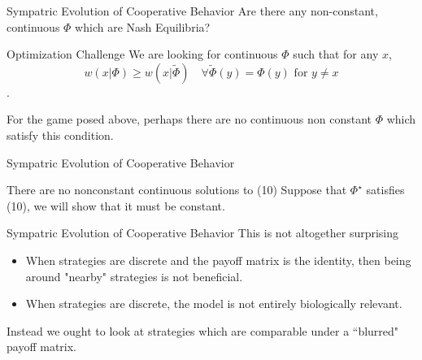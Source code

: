 \documentclass{beamer}
\begin{document}
\begin{frame}{Sympatric Evolution of Cooperative Behavior}
	Are there any non-constant, continuous $\Phi$ which are Nash Equilibria?
	\begin{block}{Optimization Challenge}
		We are looking for continuous $\Phi$ such that for any $x$,
		\begin{equation}
			w(x|\Phi)\geq w(x|\tilde\Phi)\quad \forall \tilde \Phi(y) = \Phi (y) \text{ for } y\neq x
		\end{equation}. 
	\end{block}

	For the game posed above, perhaps there are no continuous non constant $\Phi$ which satisfy this condition. 
\end{frame}

\begin{frame}{Sympatric Evolution of Cooperative Behavior}
	\begin{block}{There are no nonconstant continuous solutions to (10)}
		Suppose that $\Phi^\star$ satisfies (10), we will show that it must be constant. 
	\end{block}
\end{frame}
	
\begin{frame}{Sympatric Evolution of Cooperative Behavior}
	This is not altogether surprising
	\begin{itemize}
		\item When strategies are discrete and the payoff matrix is the identity, then being around "nearby" strategies is not beneficial. 
		\item When strategies are discrete, the model is not entirely biologically relevant. 
	\end{itemize}
	Instead we ought to look at strategies which are comparable under a ``blurred" payoff matrix. 
\end{frame}
\end{document}
